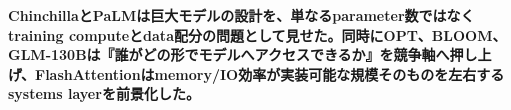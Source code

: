 \noindent\textbf{ChinchillaとPaLMは巨大モデルの設計を、単なるparameter数ではなくtraining computeとdata配分の問題として見せた。同時にOPT、BLOOM、GLM-130Bは『誰がどの形でモデルへアクセスできるか』を競争軸へ押し上げ、FlashAttentionはmemory/IO効率が実装可能な規模そのものを左右するsystems layerを前景化した。}\autocite{src-1f2518a3517b,src-4dd33abe1509,src-6ef0db0953a1,src-6ffa5c4e64ca,src-7823be169a27,src-93a582f1513c,src-99fae124f43c,src-be136777aa4f,src-d6fb00ab1ec9,src-e8da8e8f02bc}
